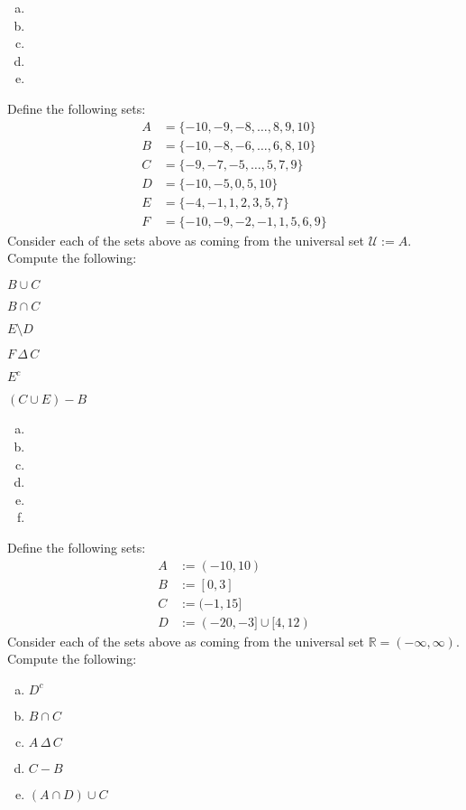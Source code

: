 \documentclass[11pt,letterpaper]{article}
\begin{document}
\sol 
\begin{enumerate}[(a)]
\item 
\item 
\item 
\item 
\item 
\end{enumerate}



\newpage



 Define the following sets:
	\[
	\begin{aligned}
	A&= \{ -10, -9, -8, \ldots, 8, 9, 10 \} \\
	B&= \{ -10, -8, -6, \ldots, 6, 8, 10 \} \\
	C&= \{ -9, -7, -5, \ldots, 5, 7, 9 \} \\
	D&= \{ -10, -5, 0, 5, 10 \} \\
	E&= \{ -4, -1, 1, 2, 3, 5, 7 \} \\
	F&= \{ -10, -9, -2, -1, 1, 5, 6, 9 \}
	\end{aligned}
	\]
Consider each of the sets above as coming from the universal set $\mathcal{U}:= A$. Compute the following:
	\begin{2enumerate}
	\item $B \cup C$
	\item $B \cap C$
	\item $E \setminus D$
	\item $F \,\Delta\, C$
	\item $E^c$
	\item $(C \cup E) - B$
	\end{2enumerate} \pspace

\sol 
\begin{enumerate}[(a)]
\item 
\item 
\item 
\item 
\item 
\item 
\end{enumerate}



\newpage



 Define the following sets:
	\[
	\begin{aligned}
	A&:= (-10, 10) \\
	B&:= [0, 3] \\
	C&:= (-1, 15] \\
	D&:= (-20, -3] \cup [4, 12)
	\end{aligned}
	\]
Consider each of the sets above as coming from the universal set $\mathbb{R}= (-\infty, \infty)$. Compute the following:
	\begin{enumerate}[(a)]
	\item $D^c$
	\item $B \cap C$
	\item $A \,\Delta\, C$
	\item $C - B$
	\item $(A \cap D) \cup C$
	\end{enumerate} \pspace
\end{document}
